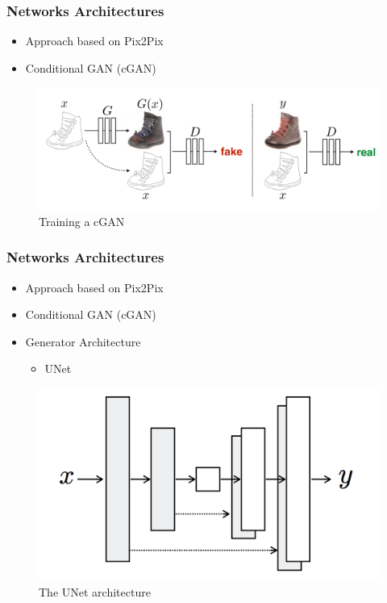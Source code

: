 \documentclass[18pt]{beamer}
\begin{document}
\begin{frame}[t]
  \frametitle{Networks Architectures}
  \begin{itemize}
  \item Approach based on Pix2Pix
  \item Conditional GAN (cGAN)
  \end{itemize}
  \begin{center}
    \begin{figure}[htb]
      \includegraphics[scale=0.33]{images/pix2pix_cgan}
      \caption{Training a cGAN}
    \end{figure}  
  \end{center}
  
\end{frame}


\begin{frame}[t]
  \frametitle{Networks Architectures}
  \begin{itemize}
  \item Approach based on Pix2Pix
  \item Conditional GAN (cGAN)
  \item Generator Architecture
    \begin{itemize}
    \item UNet
    \end{itemize}
  \end{itemize}

  \begin{center}
    \begin{figure}[htb]
      \includegraphics[scale=0.33]{images/nets/unet}
      \caption{The UNet architecture}
    \end{figure}  
  \end{center}
  
\end{frame}
\end{document}
